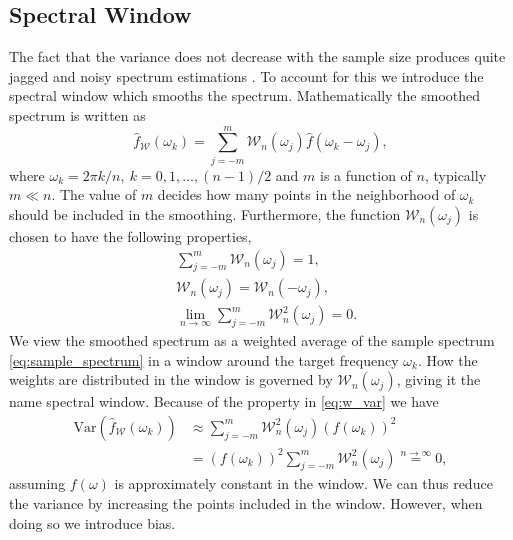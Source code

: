 \documentclass[a4paper]{memoir}
\theoremstyle{plain}
\theoremstyle{definition}
\theoremstyle{remark}
\begin{document}
\subsection{Spectral Window}
The fact that the variance does not decrease with the sample size produces quite jagged and noisy spectrum estimations \cite{shumway}.
To account for this we introduce the spectral window which smooths the spectrum.
Mathematically the smoothed spectrum is written as
\begin{equation}\label{eq:smo_spec}
        \hat{f}_{\mathcal{W}}(\omega_k) = \sum_{j = -m}^{m} \mathcal{W}_n(\omega_j) \hat{f}(\omega_k - \omega_j),
\end{equation}
where $\omega_k = 2\pi k/n,\ k = 0,1, \hdots, (n-1)/2$ and $m$ is a function of $n$, typically $m \ll n$.
The value of $m$ decides how many points in the neighborhood of $\omega_k$ should be included in the smoothing.
Furthermore, the function $\mathcal{W}_n(\omega_j)$ is chosen to have the following properties,
\begin{align}
        &\sum_{j = -m}^{m}\mathcal{W}_n(\omega_j) = 1, \nonumber \\
        &\mathcal{W}_n(\omega_j) = \mathcal{W}_n(-\omega_j), \nonumber \\
        \label{eq:w_var}
        &\lim_{n \rightarrow \infty} \sum_{j = -m}^{m}\mathcal{W}_n^2(\omega_j) = 0.
\end{align}
We view the smoothed spectrum as a weighted average of the sample spectrum \eqref{eq:sample_spectrum} in a window around the target frequency $\omega_k$.
How the weights are distributed in the window is governed by $\mathcal{W}_n(\omega_j)$, giving it the name spectral window.
Because of the property in \eqref{eq:w_var} we have
\begin{align*}
        \text{Var}(\hat{f}_\mathcal{W}(\omega_k)) &\approx \sum_{j = -m}^{m}\mathcal{W}_n^2(\omega_j)(f(\omega_k))^2 \\
                                             &=(f(\omega_k))^2 \sum_{j = -m}^{m} \mathcal{W}_n^2(\omega_j) \overset{n \rightarrow \infty}{=} 0,
\end{align*}
assuming $f(\omega)$ is approximately constant in the window.
We can thus reduce the variance by increasing the points included in the window.
However, when doing so we introduce bias.
\end{document}
